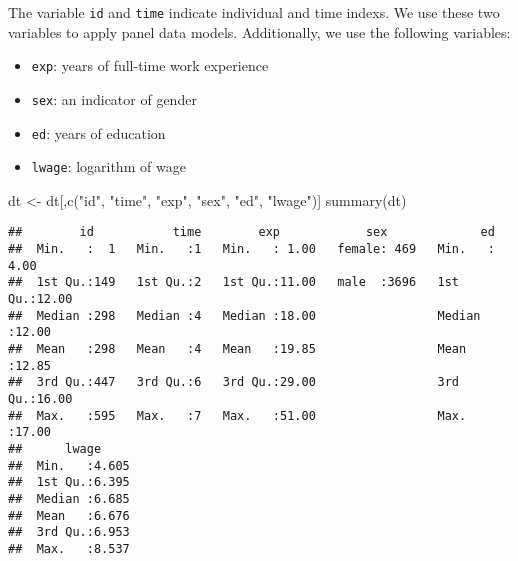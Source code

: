 \documentclass[
  12pt,
]{article}
\newenvironment{Shaded}{\begin{snugshade}}{\end{snugshade}}
\newcommand{\FunctionTok}[1]{\textcolor[rgb]{0.00,0.00,0.00}{#1}}
\newcommand{\NormalTok}[1]{#1}
\newcommand{\OtherTok}[1]{\textcolor[rgb]{0.56,0.35,0.01}{#1}}
\newcommand{\StringTok}[1]{\textcolor[rgb]{0.31,0.60,0.02}{#1}}
\providecommand{\tightlist}{%
  \setlength{\itemsep}{0pt}\setlength{\parskip}{0pt}}
\begin{document}
The variable \texttt{id} and \texttt{time} indicate individual and time
indexs. We use these two variables to apply panel data models.
Additionally, we use the following variables:

\begin{itemize}
\tightlist
\item
  \texttt{exp}: years of full-time work experience
\item
  \texttt{sex}: an indicator of gender
\item
  \texttt{ed}: years of education
\item
  \texttt{lwage}: logarithm of wage
\end{itemize}

\begin{Shaded}
\begin{Highlighting}[]
\NormalTok{dt }\OtherTok{\textless{}{-}}\NormalTok{ dt[,}\FunctionTok{c}\NormalTok{(}\StringTok{"id"}\NormalTok{, }\StringTok{"time"}\NormalTok{, }\StringTok{"exp"}\NormalTok{, }\StringTok{"sex"}\NormalTok{, }\StringTok{"ed"}\NormalTok{, }\StringTok{"lwage"}\NormalTok{)]}
\FunctionTok{summary}\NormalTok{(dt)}
\end{Highlighting}
\end{Shaded}

\begin{verbatim}
##        id           time        exp            sex             ed       
##  Min.   :  1   Min.   :1   Min.   : 1.00   female: 469   Min.   : 4.00  
##  1st Qu.:149   1st Qu.:2   1st Qu.:11.00   male  :3696   1st Qu.:12.00  
##  Median :298   Median :4   Median :18.00                 Median :12.00  
##  Mean   :298   Mean   :4   Mean   :19.85                 Mean   :12.85  
##  3rd Qu.:447   3rd Qu.:6   3rd Qu.:29.00                 3rd Qu.:16.00  
##  Max.   :595   Max.   :7   Max.   :51.00                 Max.   :17.00  
##      lwage      
##  Min.   :4.605  
##  1st Qu.:6.395  
##  Median :6.685  
##  Mean   :6.676  
##  3rd Qu.:6.953  
##  Max.   :8.537
\end{verbatim}
\end{document}
